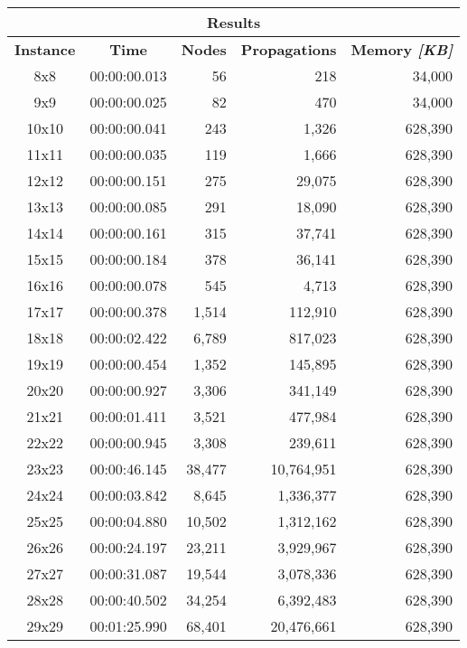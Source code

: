 
\begin{center}
    \begin{tabular}{|c|c|r|r|r|}
        \hline
        \multicolumn{5}{|c|}{\textbf{Results}} \\
        \hline
        \textbf{Instance} & \textbf{Time} & \textbf{Nodes} & \textbf{Propagations} & \textbf{Memory \textit{[KB]}} \\
        
        \hline
		8x8 & 00:00:00.013 & 56 & 218 & 34,000 \\ \hline
		9x9 & 00:00:00.025 & 82 & 470 & 34,000 \\ \hline
		10x10 & 00:00:00.041 & 243 & 1,326 & 628,390 \\ \hline
		11x11 & 00:00:00.035 & 119 & 1,666 & 628,390 \\ \hline
		12x12 & 00:00:00.151 & 275 & 29,075 & 628,390 \\ \hline
		13x13 & 00:00:00.085 & 291 & 18,090 & 628,390 \\ \hline
		14x14 & 00:00:00.161 & 315 & 37,741 & 628,390 \\ \hline
		15x15 & 00:00:00.184 & 378 & 36,141 & 628,390 \\ \hline
		16x16 & 00:00:00.078 & 545 & 4,713 & 628,390 \\ \hline
		17x17 & 00:00:00.378 & 1,514 & 112,910 & 628,390 \\ \hline
		18x18 & 00:00:02.422 & 6,789 & 817,023 & 628,390 \\ \hline
		19x19 & 00:00:00.454 & 1,352 & 145,895 & 628,390 \\ \hline
		20x20 & 00:00:00.927 & 3,306 & 341,149 & 628,390 \\ \hline
		21x21 & 00:00:01.411 & 3,521 & 477,984 & 628,390 \\ \hline
		22x22 & 00:00:00.945 & 3,308 & 239,611 & 628,390 \\ \hline
		23x23 & 00:00:46.145 & 38,477 & 10,764,951 & 628,390 \\ \hline
		24x24 & 00:00:03.842 & 8,645 & 1,336,377 & 628,390 \\ \hline
		25x25 & 00:00:04.880 & 10,502 & 1,312,162 & 628,390 \\ \hline
		26x26 & 00:00:24.197 & 23,211 & 3,929,967 & 628,390 \\ \hline
		27x27 & 00:00:31.087 & 19,544 & 3,078,336 & 628,390 \\ \hline
		28x28 & 00:00:40.502 & 34,254 & 6,392,483 & 628,390 \\ \hline
		29x29 & 00:01:25.990 & 68,401 & 20,476,661 & 628,390 \\ \hline

\end{tabular}
\end{center}

